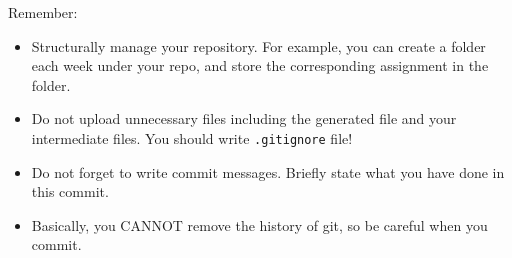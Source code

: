 \documentclass[english]{../TexTemplate/thesis}
\begin{document}
Remember:
\begin{itemize}
\item Structurally manage your repository.
For example, you can create a folder each week under your repo, and store the corresponding assignment in the folder.
\item Do not upload unnecessary files including the generated file and your intermediate files.
You should write \verb'.gitignore' file!
\item Do not forget to write commit messages. Briefly state what you have done in this commit.
\item Basically, you CANNOT remove the history of git, so be careful when you commit.
\end{itemize}
\end{document}
